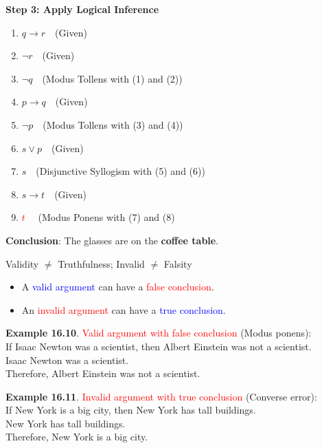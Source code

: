 \documentclass[aspectratio=169]{beamer}
\providecommand{\Blue}[1]{\textcolor{blue}{#1}}
\providecommand{\Red}[1]{\textcolor{red}{#1}}
\begin{document}
\begin{frame}[plain]{}

{\bf Step 3: Apply Logical Inference}

\begin{enumerate}[<+->]
    \item $q \rightarrow r$\  \ (Given)
    \item $\neg r$\ \ (Given)
    \item $\neg q$\ \ (Modus Tollens with (1) and (2))
    \item $p \rightarrow q$\  \  (Given)
    \item $\neg p$\ \ (Modus Tollens with (3) and (4))
    \item $s \vee p$\ \ (Given)
    \item $s$\ \ (Disjunctive Syllogism with (5) and (6))
    \item  $s \rightarrow t$\ \ (Given)
    \item \Red{$t$} \ \ (Modus Ponens with (7) and (8)
    \end{enumerate}
\pause 

{\bf Conclusion}:
The glasses are on the \textbf{coffee table}.
 
 \end{frame}
    
\begin{frame}[plain]{Validity $\neq$ Truthfulness; Invalid $\neq$ Falsity}

  \begin{itemize}
    \item A \Blue{valid argument} can have a \Red{false conclusion}.
    \item An \Red{invalid argument} can have a \Blue{true conclusion}.
  \end{itemize}
  \medskip
  
  {\bf Example 16.10}. \Red{Valid argument with false conclusion} (Modus ponens):\\
     If Isaac Newton was a scientist, then Albert Einstein was not a
      scientist.\\
     Isaac Newton was a scientist. \\
     Therefore, Albert Einstein was not a scientist.
  \pause
  
  \medskip
  
  {\bf Example 16.11}. \Red{Invalid argument with true conclusion} (Converse error):\\
   If New York is a big city, then New York has tall buildings.\\
   New York has tall buildings.\\
   Therefore, New York is a big city.

\end{frame}
\end{document}
